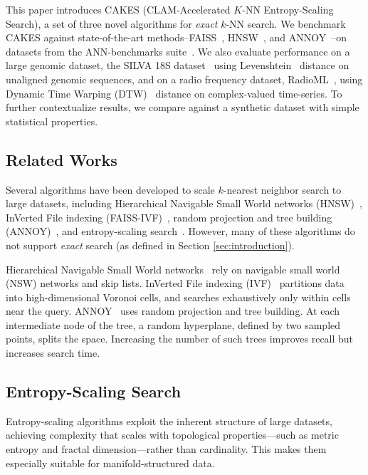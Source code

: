 This paper introduces CAKES (CLAM-Accelerated $K$-NN Entropy-Scaling Search), a set of three novel algorithms for \emph{exact} $k$-NN search.
We benchmark CAKES against state-of-the-art methods--FAISS~\cite{johnson2019billion}, HNSW~\cite{malkov2016hnsw}, and ANNOY~\cite{annoy}--on datasets from the ANN-benchmarks suite~\cite{aumuller2020ann}.
We also evaluate performance on a large genomic dataset, the SILVA 18S dataset~\cite{10.1093/nar/gks1219} using Levenshtein~\cite{levenshtein1966binary} distance on unaligned genomic sequences, and on a radio frequency dataset, RadioML~\cite{oshea2018radioml}, using Dynamic Time Warping (DTW)~\cite{gold2018dynamic} distance on complex-valued time-series.
To further contextualize results, we compare against a synthetic dataset with simple statistical properties.


\subsection{Related Works}
\label{sec:intoduction:related-works}

Several algorithms have been developed to scale $k$-nearest neighbor search to large datasets, including Hierarchical Navigable Small World networks (HNSW)~\cite{malkov2016hnsw}, InVerted File indexing (FAISS-IVF)~\cite{faissivf}, random projection and tree building (ANNOY)~\cite{annoy}, and entropy-scaling search~\cite{yu2015entropy, ishaq2019clustered}. However, many of these algorithms do not support \emph{exact} search (as defined in Section \ref{sec:introduction}).

Hierarchical Navigable Small World networks~\cite{malkov2016hnsw} rely on navigable small world (NSW) networks and skip lists. InVerted File indexing (IVF)~\cite{faissivf, sacks1987multikey, kent1990signature} partitions data into high-dimensional Voronoi cells, and searches exhaustively only within cells near the query. ANNOY~\cite{annoy} uses random projection and tree building.
At each intermediate node of the tree, a random hyperplane, defined by two sampled points, splits the space.  Increasing the number of such trees improves recall but increases search time.


\subsection{Entropy-Scaling Search}
\label{sec:intoduction:entropy-scaling-search}

Entropy-scaling algorithms exploit the inherent structure of large datasets, achieving complexity that scales with topological properties—such as metric entropy and fractal dimension—rather than cardinality. This makes them especially suitable for manifold-structured data.

